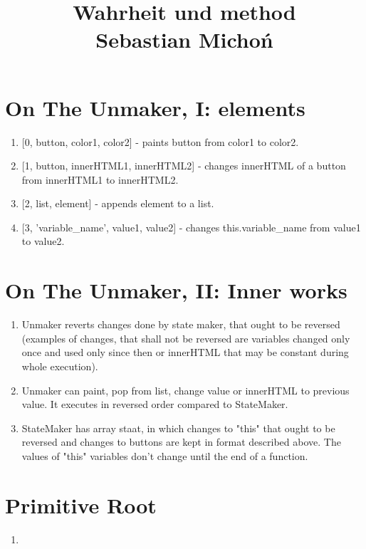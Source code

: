 \documentclass[12pt]{article}
\begin{document}
\title{Wahrheit und method\\
\large Sebastian Michoń}
\date{\vspace{-10ex}}
\maketitle

\section{On The Unmaker, I: elements}
\begin {enumerate}
	\item {[0, button, color1, color2]} - paints button from color1 to color2.
	\item {[1, button, innerHTML1, innerHTML2]} - changes innerHTML of a button from innerHTML1 to innerHTML2.
	\item {[2, list, element]} - appends element to a list.
	\item {[3, 'variable\_name', value1, value2]} - changes this.variable\_name from value1 to value2.
\end{enumerate}
\section{On The Unmaker, II: Inner works}
\begin {enumerate}
	\item Unmaker reverts changes done by state maker, that ought to be reversed (examples of changes, that shall not be reversed are variables changed only once and used only since then or innerHTML that may be constant during whole execution).
	\item Unmaker can paint, pop from list, change value or innerHTML to previous value. It executes in reversed order compared to StateMaker.
	\item StateMaker has array staat, in which changes to "this" that ought to be reversed and changes to buttons are kept in format described above. The values of "this" variables don't change until the end of a function.
\end {enumerate}

\section{Primitive Root}
\begin{enumerate}
	\item 
\end{enumerate}
\end{document}
